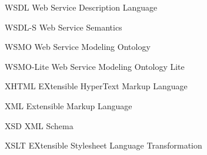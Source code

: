 \begin{siglas}
    \item[WSDL]         Web Service Description Language
    \item[WSDL-S]       Web Service Semantics
    \item[WSMO]         Web Service Modeling Ontology
    \item[WSMO-Lite]    Web Service Modeling Ontology Lite
    \item[XHTML]        EXtensible HyperText Markup Language
    \item[XML]          Extensible Markup Language
    \item[XSD]          XML Schema
    \item[XSLT]         EXtensible Stylesheet Language Transformation
\end{siglas}